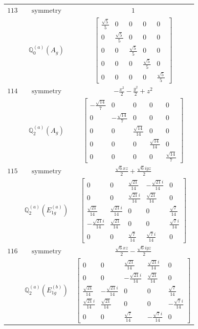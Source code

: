 \documentclass[fleqn,8pt,landscape]{jsarticle}
\begin{document}
\begin{longtable}{ccc}
$ 113 $ & $ \text{symmetry} $ & $ 1 $ \\
$  $ & $ \mathbb{Q}_{0}^{(a)}(A_{g}) $ & $ \begin{bmatrix} \frac{\sqrt{5}}{5} & 0 & 0 & 0 & 0 \\ 0 & \frac{\sqrt{5}}{5} & 0 & 0 & 0 \\ 0 & 0 & \frac{\sqrt{5}}{5} & 0 & 0 \\ 0 & 0 & 0 & \frac{\sqrt{5}}{5} & 0 \\ 0 & 0 & 0 & 0 & \frac{\sqrt{5}}{5} \end{bmatrix} $ \\ \hline
$ 114 $ & $ \text{symmetry} $ & $ - \frac{x^{2}}{2} - \frac{y^{2}}{2} + z^{2} $ \\
$  $ & $ \mathbb{Q}_{2}^{(a)}(A_{g}) $ & $ \begin{bmatrix} - \frac{\sqrt{14}}{7} & 0 & 0 & 0 & 0 \\ 0 & - \frac{\sqrt{14}}{7} & 0 & 0 & 0 \\ 0 & 0 & \frac{\sqrt{14}}{14} & 0 & 0 \\ 0 & 0 & 0 & \frac{\sqrt{14}}{14} & 0 \\ 0 & 0 & 0 & 0 & \frac{\sqrt{14}}{7} \end{bmatrix} $ \\ \hline
$ 115 $ & $ \text{symmetry} $ & $ \frac{\sqrt{6} x z}{2} + \frac{\sqrt{6} i y z}{2} $ \\
$  $ & $ \mathbb{Q}_{2}^{(a)}(E_{1g}^{(a)}) $ & $ \begin{bmatrix} 0 & 0 & \frac{\sqrt{21}}{14} & - \frac{\sqrt{21} i}{14} & 0 \\ 0 & 0 & \frac{\sqrt{21} i}{14} & \frac{\sqrt{21}}{14} & 0 \\ \frac{\sqrt{21}}{14} & \frac{\sqrt{21} i}{14} & 0 & 0 & \frac{\sqrt{7}}{14} \\ - \frac{\sqrt{21} i}{14} & \frac{\sqrt{21}}{14} & 0 & 0 & \frac{\sqrt{7} i}{14} \\ 0 & 0 & \frac{\sqrt{7}}{14} & \frac{\sqrt{7} i}{14} & 0 \end{bmatrix} $ \\ \hline
$ 116 $ & $ \text{symmetry} $ & $ \frac{\sqrt{6} x z}{2} - \frac{\sqrt{6} i y z}{2} $ \\
$  $ & $ \mathbb{Q}_{2}^{(a)}(E_{1g}^{(b)}) $ & $ \begin{bmatrix} 0 & 0 & \frac{\sqrt{21}}{14} & \frac{\sqrt{21} i}{14} & 0 \\ 0 & 0 & - \frac{\sqrt{21} i}{14} & \frac{\sqrt{21}}{14} & 0 \\ \frac{\sqrt{21}}{14} & - \frac{\sqrt{21} i}{14} & 0 & 0 & \frac{\sqrt{7}}{14} \\ \frac{\sqrt{21} i}{14} & \frac{\sqrt{21}}{14} & 0 & 0 & - \frac{\sqrt{7} i}{14} \\ 0 & 0 & \frac{\sqrt{7}}{14} & - \frac{\sqrt{7} i}{14} & 0 \end{bmatrix} $ \\ \hline

\end{longtable}
\end{document}
